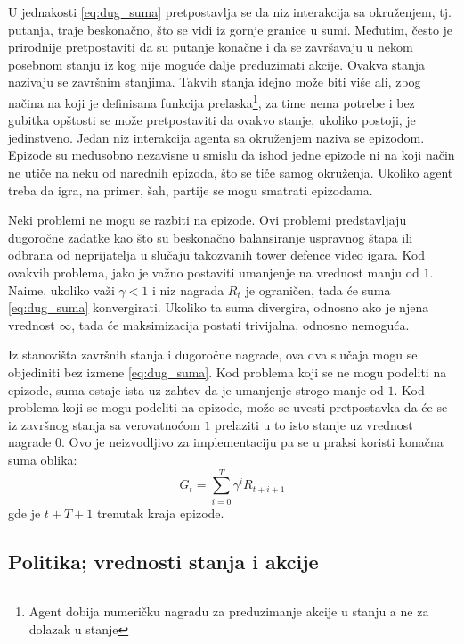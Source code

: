 U jednakosti \eqref{eq:dug_suma} pretpostavlja se da niz interakcija sa okruženjem, tj. putanja, traje beskonačno, što se vidi iz gornje granice u sumi. Međutim, često je prirodnije pretpostaviti da su putanje konačne i da se završavaju u nekom posebnom stanju iz kog nije moguće dalje preduzimati akcije. Ovakva stanja nazivaju se završnim stanjima. Takvih stanja idejno može biti više ali, zbog načina na koji je definisana funkcija prelaska\footnote{Agent dobija numeričku nagradu za preduzimanje akcije u stanju a ne za dolazak u stanje}, za time nema potrebe i bez gubitka opštosti se može pretpostaviti da ovakvo stanje, ukoliko postoji, je jedinstveno. Jedan niz interakcija agenta sa okruženjem naziva se epizodom. Epizode su međusobno nezavisne u smislu da ishod jedne epizode ni na koji način ne utiče na neku od narednih epizoda, što se tiče samog okruženja. Ukoliko agent treba da igra, na primer, šah, partije se mogu smatrati epizodama. 
\par 
Neki problemi ne mogu se razbiti na epizode. Ovi problemi predstavljaju dugoročne zadatke kao što su beskonačno balansiranje uspravnog štapa ili odbrana od neprijatelja u slučaju takozvanih tower defence video igara. Kod ovakvih problema, jako je važno postaviti umanjenje na vrednost manju od $1$. Naime, ukoliko važi $\gamma < 1$ i niz nagrada $R_t$ je ograničen, tada će suma \eqref{eq:dug_suma} konvergirati. Ukoliko ta suma divergira, odnosno ako je njena vrednost $\infty$, tada će maksimizacija postati trivijalna, odnosno nemoguća.
\par 
Iz stanovišta završnih stanja i dugoročne nagrade, ova dva slučaja mogu se objediniti bez izmene \eqref{eq:dug_suma}. Kod problema koji se ne mogu podeliti na epizode, suma ostaje ista uz zahtev da je umanjenje strogo manje od $1$. Kod problema koji se mogu podeliti na epizode, može se uvesti pretpostavka da će se iz završnog stanja sa verovatnoćom $1$ prelaziti u to isto stanje uz vrednost nagrade $0$. Ovo je neizvodljivo za implementaciju pa se u praksi koristi konačna suma oblika:
\begin{equation}
	G_t = \sum_{i=0}^{T} \gamma^iR_{t+i+1}
\end{equation}
gde je $t+T+1$ trenutak kraja epizode. 

\subsection{Politika; vrednosti stanja i akcije}

